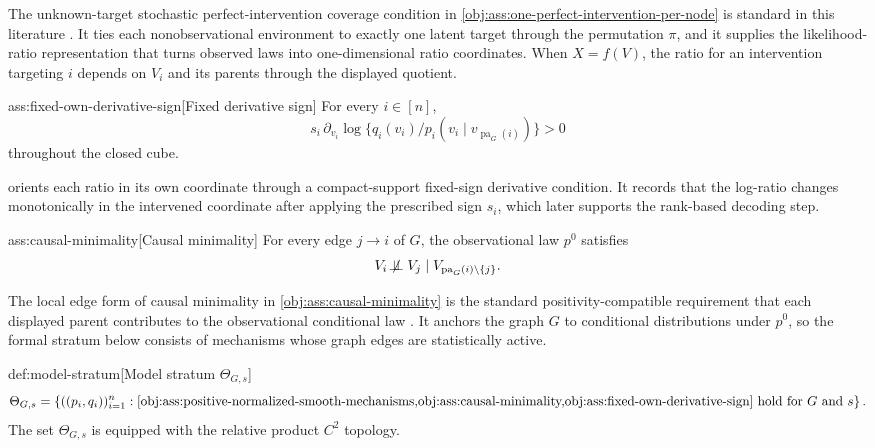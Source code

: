 The unknown-target stochastic perfect-intervention coverage condition in \cref{obj:ass:one-perfect-intervention-per-node} is standard in this literature \citep{vonKugelgenEtAl2023UnknownInterventions}. It ties each nonobservational environment to exactly one latent target through the permutation \(\pi\), and it supplies the likelihood-ratio representation that turns observed laws into one-dimensional ratio coordinates. When \(X=f(V)\), the ratio for an intervention targeting \(i\) depends on \(V_i\) and its parents through the displayed quotient.

\begin{assumptionv}{ass:fixed-own-derivative-sign}[Fixed derivative sign]
For every \(i\in[n]\),
\[
s_i\,\partial_{v_i}\log\{q_i(v_i)/p_i(v_i\mid v_{\operatorname{pa}_G(i)})\}>0
\]
throughout the closed cube.
\end{assumptionv}

 orients each ratio in its own coordinate through a compact-support fixed-sign derivative condition. It records that the log-ratio changes monotonically in the intervened coordinate after applying the prescribed sign \(s_i\), which later supports the rank-based decoding step.

\begin{assumptionv}{ass:causal-minimality}[Causal minimality]
For every edge \(j\to i\) of \(G\), the observational law \(p^0\) satisfies
\[
V_i\not\!\perp\!\!\!\perp V_j
\mid
V_{\operatorname{pa}_G(i)\setminus\{j\}} .
\]
\end{assumptionv}

The local edge form of causal minimality in \cref{obj:ass:causal-minimality} is the standard positivity-compatible requirement that each displayed parent contributes to the observational conditional law \citep{SpirtesGlymourScheines2000}. It anchors the graph \(G\) to conditional distributions under \(p^0\), so the formal stratum below consists of mechanisms whose graph edges are statistically active.

\begin{definitionv}{def:model-stratum}[Model stratum \(\Theta_{G,s}\)]
\[
\Theta_{G,s}
=
\left\{
((p_i,q_i))_{i=1}^{n}:
\cref{obj:ass:positive-normalized-smooth-mechanisms,obj:ass:causal-minimality,obj:ass:fixed-own-derivative-sign}
\text{ hold for }G\text{ and }s
\right\}.
\]
The set \(\Theta_{G,s}\) is equipped with the relative product \(C^2\) topology.
\end{definitionv}

